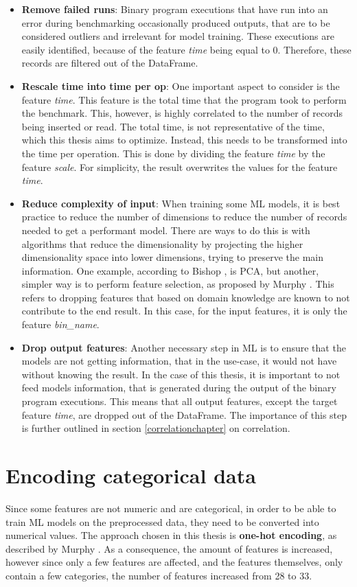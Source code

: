 \begin{itemize}
    \item \textbf{Remove failed runs}: Binary program executions that have run into an error during benchmarking occasionally produced outputs, that are to be considered outliers and irrelevant for model training. These executions are easily identified, because of the feature \textit{time} being equal to 0. Therefore, these records are filtered out of the DataFrame. 
    \item \textbf{Rescale time into time per op}: One important aspect to consider is the feature \textit{time}. This feature is the total time that the program took to perform the benchmark. This, however, is highly correlated to the number of records being inserted or read. The total time, is not representative of the time, which this thesis aims to optimize. Instead, this needs to be transformed into the time per operation. This is done by dividing the feature \textit{time} by the feature \textit{scale}. For simplicity, the result overwrites the values for the feature \textit{time}. 
    \item \textbf{Reduce complexity of input}: When training some \ac{ML} models, it is best practice to reduce the number of dimensions to reduce the number of records needed to get a performant model. There are ways to do this is with algorithms that reduce the dimensionality by projecting the higher dimensionality space into lower dimensions, trying to preserve the main information. One example, according to Bishop \parencite{bishopML}, is PCA, but another, simpler way is to perform feature selection, as proposed by Murphy \parencite{murphy2012machine}. This refers to dropping features that based on domain knowledge are known to not contribute to the end result. In this case, for the input features, it is only the feature \textit{bin\_name}.  
    \item \textbf{Drop output features}: Another necessary step in \ac{ML} is to ensure that the models are not getting information, that in the use-case, it would not have without knowing the result. In the case of this thesis, it is important to not feed models information, that is generated during the output of the binary program executions. This means that all output features, except the target feature \textit{time}, are dropped out of the DataFrame. The importance of this step is further outlined in section \ref{correlationchapter} on correlation.
\end{itemize}

\section{Encoding categorical data}
Since some features are not numeric and are categorical, in order to be able to train \ac{ML} models on the preprocessed data, they need to be converted into numerical values. The approach chosen in this thesis is \textbf{one-hot encoding}, as described by Murphy \parencite{murphy2012machine}. As a consequence, the amount of features is increased, however since only a few features are affected, and the features themselves, only contain a few categories, the number of features increased from 28 to 33.

